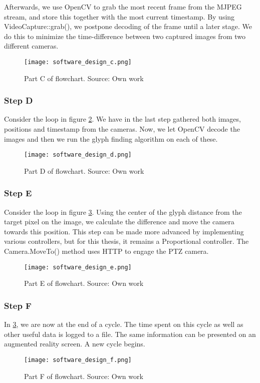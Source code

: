Afterwards, we use OpenCV to grab the most recent frame from the MJPEG stream, and store this together with the most current timestamp. By using VideoCapture::grab(), we postpone decoding of the frame until a later stage. We do this to minimize the time-difference between two captured images from two different cameras.

\begin{figure}[ht]
    \centering
    \texttt{[image: software\_design\_c.png]}
    \caption{Part C of flowchart. Source: Own work}
    \label{fig:software_design_c}
\end{figure}
\FloatBarrier


\subsubsection{Step D}
Consider the loop in figure \ref{fig:software_design_d}. We have in the last step gathered both images, positions and timestamp from the cameras. Now, we let OpenCV decode the images and then we run the glyph finding algorithm on each of these.
\begin{figure}[ht]
    \centering
    \texttt{[image: software\_design\_d.png]}
    \caption{Part D of flowchart. Source: Own work}
    \label{fig:software_design_d}
\end{figure}
\FloatBarrier

\subsubsection{Step E}
Consider the loop in figure \ref{fig:software_design_e}. Using the center of the glyph distance from the target pixel on the image, we calculate the difference and move the camera towards this position. This step can be made more advanced by implementing various controllers, but for this thesis, it remains a Proportional controller. The Camera.MoveTo() method uses HTTP to engage the PTZ camera.
\begin{figure}[ht]
    \centering
    \texttt{[image: software\_design\_e.png]}
    \caption{Part E of flowchart. Source: Own work}
    \label{fig:software_design_e}
\end{figure}
\FloatBarrier

\subsubsection{Step F}
In \ref{fig:software_design_e}, we are now at the end of a cycle. The time spent on this cycle as well as other useful data is logged to a file. The same information can be presented on an augmented reality screen. A new cycle begins.
\begin{figure}[ht]
    \centering
    \texttt{[image: software\_design\_f.png]}
    \caption{Part F of flowchart. Source: Own work}
    \label{fig:software_design_f}
\end{figure}
\FloatBarrier

